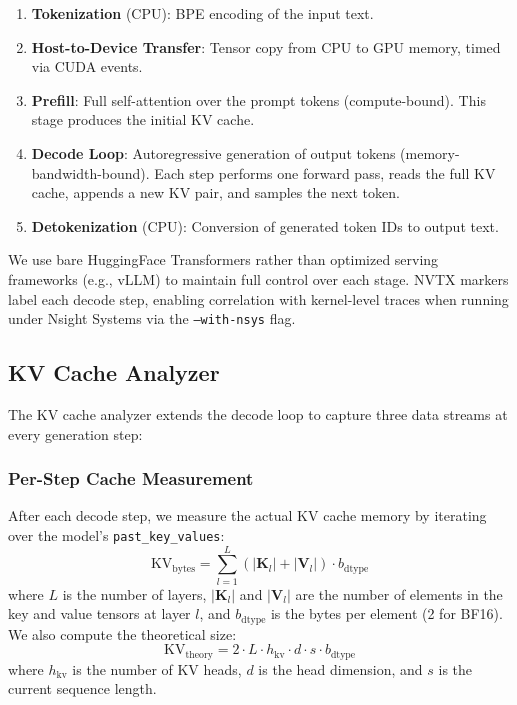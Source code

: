\documentclass[conference]{IEEEtran}
\begin{document}
\begin{enumerate}
\item \textbf{Tokenization} (CPU): BPE encoding of the input text.
\item \textbf{Host-to-Device Transfer}: Tensor copy from CPU to GPU memory, timed via CUDA events.
\item \textbf{Prefill}: Full self-attention over the prompt tokens (compute-bound). This stage produces the initial KV cache.
\item \textbf{Decode Loop}: Autoregressive generation of output tokens (memory-bandwidth-bound). Each step performs one forward pass, reads the full KV cache, appends a new KV pair, and samples the next token.
\item \textbf{Detokenization} (CPU): Conversion of generated token IDs to output text.
\end{enumerate}

We use bare HuggingFace Transformers rather than optimized serving frameworks (e.g., vLLM) to maintain full control over each stage. NVTX markers label each decode step, enabling correlation with kernel-level traces when running under Nsight Systems via the \texttt{--with-nsys} flag.

\subsection{KV Cache Analyzer}

The KV cache analyzer extends the decode loop to capture three data streams at every generation step:

\subsubsection{Per-Step Cache Measurement}
After each decode step, we measure the actual KV cache memory by iterating over the model's \texttt{past\_key\_values}:
\begin{equation}
\text{KV}_{\text{bytes}} = \sum_{l=1}^{L} \left( |\mathbf{K}_l| + |\mathbf{V}_l| \right) \cdot b_{\text{dtype}}
\end{equation}
where $L$ is the number of layers, $|\mathbf{K}_l|$ and $|\mathbf{V}_l|$ are the number of elements in the key and value tensors at layer $l$, and $b_{\text{dtype}}$ is the bytes per element (2 for BF16). We also compute the theoretical size:
\begin{equation}
\text{KV}_{\text{theory}} = 2 \cdot L \cdot h_{\text{kv}} \cdot d \cdot s \cdot b_{\text{dtype}}
\end{equation}
where $h_{\text{kv}}$ is the number of KV heads, $d$ is the head dimension, and $s$ is the current sequence length.
\end{document}
